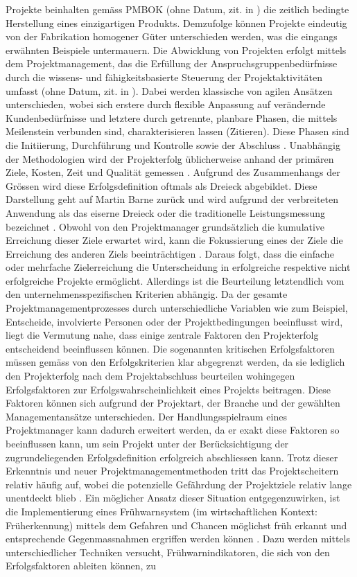  Projekte beinhalten gemäss PMBOK (ohne Datum, zit. in \citealp[S.~17]{burke10}) die zeitlich bedingte Herstellung eines einzigartigen Produkts. Demzufolge können Projekte eindeutig von der Fabrikation homogener Güter unterschieden werden, was die eingangs erwähnten Beispiele untermauern. Die Abwicklung von Projekten erfolgt mittels dem Projektmanagement, das die Erfüllung der Anspruchsgruppenbedürfnisse durch die wissens- und fähigkeitsbasierte Steuerung der Projektaktivitäten umfasst (ohne Datum, zit. in \citealp[S.~18]{burke10}). Dabei werden klassische von agilen Ansätzen unterschieden, wobei sich erstere durch flexible Anpassung auf verändernde Kundenbedürfnisse und letztere durch getrennte, planbare Phasen, die mittels Meilenstein verbunden sind, charakterisieren lassen (Zitieren). Diese Phasen sind die Initiierung, Durchführung und Kontrolle sowie der Abschluss \citep{pmhodm}. Unabhängig der Methodologien wird der Projekterfolg üblicherweise anhand der primären Ziele, Kosten, Zeit und Qualität gemessen \citep{Atk1999}. Aufgrund des Zusammenhangs der Grössen wird diese Erfolgsdefinition oftmals als Dreieck abgebildet. Diese Darstellung geht auf Martin Barne zurück und wird aufgrund der verbreiteten Anwendung als das eiserne Dreieck oder die traditionelle Leistungsmessung bezeichnet \citep{kerz14,lock07}. Obwohl von den Projektmanager grundsätzlich die kumulative Erreichung dieser Ziele erwartet wird, kann die Fokussierung eines der Ziele die Erreichung des anderen Ziels beeinträchtigen \citep[S.~21]{lock07}. Daraus folgt, dass die einfache oder mehrfache Zielerreichung die Unterscheidung in erfolgreiche respektive nicht erfolgreiche Projekte ermöglicht. Allerdings ist die Beurteilung letztendlich vom den unternehmensspezifischen Kriterien abhängig. Da der gesamte Projektmanagementprozesses durch unterschiedliche Variablen wie zum Beispiel, Entscheide, involvierte Personen oder der Projektbedingungen beeinflusst wird, liegt die Vermutung nahe, dass einige zentrale Faktoren den Projekterfolg entscheidend beeinflussen können. Die sogenannten kritischen Erfolgsfaktoren müssen gemäss \cite{BeDeNov2015} von den Erfolgskriterien klar abgegrenzt werden, da sie lediglich den Projekterfolg nach dem Projektabschluss beurteilen wohingegen Erfolgsfaktoren zur Erfolgswahrscheinlichkeit eines Projekts beitragen. Diese Faktoren können sich aufgrund der Projektart, der Branche und der gewählten Managementansätze unterschieden. Der Handlungsspielraum eines Projektmanager kann dadurch erweitert werden, da er exakt diese Faktoren so beeinflussen kann, um sein Projekt unter der Berücksichtigung der zugrundeliegenden Erfolgsdefinition erfolgreich abschliessen kann. Trotz dieser Erkenntnis und neuer Projektmanagementmethoden tritt das Projektscheitern relativ häufig auf, wobei die potenzielle Gefährdung der Projektziele relativ lange unentdeckt blieb \citep{WiKlak12,haan13}. Ein möglicher Ansatz dieser Situation entgegenzuwirken, ist die Implementierung eines Frühwarnsystem (im wirtschaftlichen Kontext: Früherkennung) mittels dem Gefahren und Chancen möglichst früh erkannt und entsprechende Gegenmassnahmen ergriffen werden können \citep{haankra13}. Dazu werden mittels unterschiedlicher Techniken versucht, Frühwarnindikatoren, die sich von den Erfolgsfaktoren ableiten können, zu 